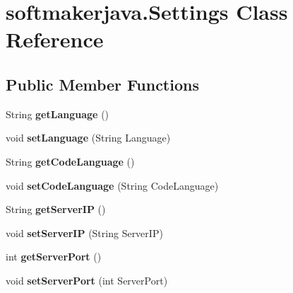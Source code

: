 \hypertarget{classsoftmakerjava_1_1_settings}{}\section{softmakerjava.\+Settings Class Reference}
\label{classsoftmakerjava_1_1_settings}
\subsection*{Public Member Functions}
\begin{DoxyCompactItemize}
\item 
String {\bfseries get\+Language} ()\hypertarget{classsoftmakerjava_1_1_settings_a058521f262df4c1399d496da81ab89a5}{}\label{classsoftmakerjava_1_1_settings_a058521f262df4c1399d496da81ab89a5}

\item 
void {\bfseries set\+Language} (String Language)\hypertarget{classsoftmakerjava_1_1_settings_ad48a2cf35ccfa7f69682c581683800ac}{}\label{classsoftmakerjava_1_1_settings_ad48a2cf35ccfa7f69682c581683800ac}

\item 
String {\bfseries get\+Code\+Language} ()\hypertarget{classsoftmakerjava_1_1_settings_a887aad4d91579cd1ab6f831bbaa43be8}{}\label{classsoftmakerjava_1_1_settings_a887aad4d91579cd1ab6f831bbaa43be8}

\item 
void {\bfseries set\+Code\+Language} (String Code\+Language)\hypertarget{classsoftmakerjava_1_1_settings_a4b47b47adbc0b4df7270190eba9a9b34}{}\label{classsoftmakerjava_1_1_settings_a4b47b47adbc0b4df7270190eba9a9b34}

\item 
String {\bfseries get\+Server\+IP} ()\hypertarget{classsoftmakerjava_1_1_settings_abfe64adb52fd010b00c708a8604406b8}{}\label{classsoftmakerjava_1_1_settings_abfe64adb52fd010b00c708a8604406b8}

\item 
void {\bfseries set\+Server\+IP} (String Server\+IP)\hypertarget{classsoftmakerjava_1_1_settings_a6ad428542d1ecda64f41eef635a93b0c}{}\label{classsoftmakerjava_1_1_settings_a6ad428542d1ecda64f41eef635a93b0c}

\item 
int {\bfseries get\+Server\+Port} ()\hypertarget{classsoftmakerjava_1_1_settings_aa4c941689fa177441994a59118782729}{}\label{classsoftmakerjava_1_1_settings_aa4c941689fa177441994a59118782729}

\item 
void {\bfseries set\+Server\+Port} (int Server\+Port)\hypertarget{classsoftmakerjava_1_1_settings_a33c87cc25d677e70a9be56ee43c2e88a}{}\label{classsoftmakerjava_1_1_settings_a33c87cc25d677e70a9be56ee43c2e88a}

\end{DoxyCompactItemize}
